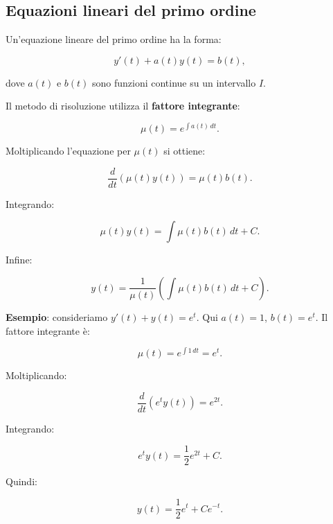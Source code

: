 \documentclass[a4paper,12pt]{article}
\begin{document}
\subsection{Equazioni lineari del primo ordine}
Un’equazione lineare del primo ordine ha la forma:


\[
y'(t) + a(t)y(t) = b(t),
\]


dove $a(t)$ e $b(t)$ sono funzioni continue su un intervallo $I$.  

Il metodo di risoluzione utilizza il \textbf{fattore integrante}:


\[
\mu(t) = e^{\int a(t)\,dt}.
\]


Moltiplicando l'equazione per $\mu(t)$ si ottiene:


\[
\frac{d}{dt}(\mu(t)y(t)) = \mu(t)b(t).
\]


Integrando:


\[
\mu(t)y(t) = \int \mu(t)b(t)\,dt + C.
\]


Infine:


\[
y(t) = \frac{1}{\mu(t)}\left(\int \mu(t)b(t)\,dt + C\right).
\]



\textbf{Esempio}: consideriamo $y'(t) + y(t) = e^t$.  
Qui $a(t)=1$, $b(t)=e^t$.  
Il fattore integrante è:


\[
\mu(t) = e^{\int 1\,dt} = e^t.
\]


Moltiplicando:


\[
\frac{d}{dt}(e^t y(t)) = e^{2t}.
\]


Integrando:


\[
e^t y(t) = \frac{1}{2}e^{2t} + C.
\]


Quindi:


\[
y(t) = \frac{1}{2}e^t + Ce^{-t}.
\]
\end{document}
